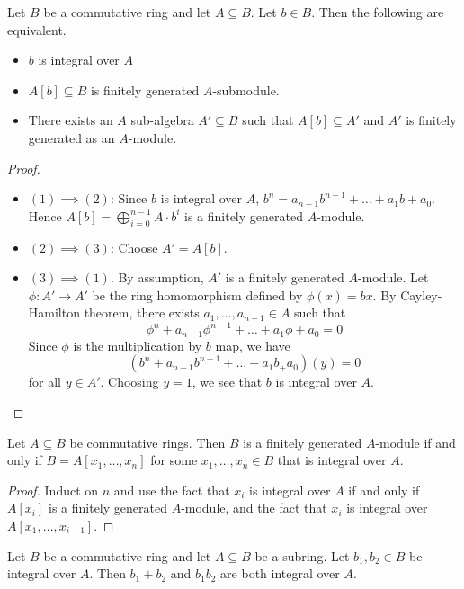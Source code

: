 \documentclass[a4paper]{article}
\begin{document}
\begin{prp}{}{} Let $B$ be a commutative ring and let $A\subseteq B$. Let $b\in B$. Then the following are equivalent. 
\begin{itemize}
\item $b$ is integral over $A$
\item $A[b]\subseteq B$ is finitely generated $A$-submodule. 
\item There exists an $A$ sub-algebra $A'\subseteq B$ such that $A[b]\subseteq A'$ and $A'$ is finitely generated as an $A$-module. 
\end{itemize} \tcbline
\begin{proof}~\\
\begin{itemize}
\item $(1)\implies(2)$: Since $b$ is integral over $A$, $b^n=a_{n-1}b^{n-1}+\dots+a_1b+a_0$. Hence $A[b]=\bigoplus_{i=0}^{n-1}A\cdot b^i$ is a finitely generated $A$-module. 
\item $(2)\implies(3)$: Choose $A'=A[b]$. 
\item $(3)\implies(1)$. By assumption, $A'$ is a finitely generated $A$-module. Let $\phi:A'\to A'$ be the ring homomorphism defined by $\phi(x)=bx$. By Cayley-Hamilton theorem, there exists $a_1,\dots,a_{n-1}\in A$ such that $$\phi^n+a_{n-1}\phi^{n-1}+\dots+a_1\phi+a_0=0$$ Since $\phi$ is the multiplication by $b$ map, we have $$(b^n+a_{n-1}b^{n-1}+\dots+a_1b_+a_0)(y)=0$$ for all $y\in A'$. Choosing $y=1$, we see that $b$ is integral over $A$. 
\end{itemize}
\end{proof}
\end{prp}

\begin{lmm}{}{} Let $A\subseteq B$ be commutative rings. Then $B$ is a finitely generated $A$-module if and only if $B=A[x_1,\dots,x_n]$ for some $x_1,\dots,x_n\in B$ that is integral over $A$. \tcbline
\begin{proof}
Induct on $n$ and use the fact that $x_i$ is integral over $A$ if and only if $A[x_i]$ is a finitely generated $A$-module, and the fact that $x_i$ is integral over $A[x_1,\dots,x_{i-1}]$. 
\end{proof}
\end{lmm}

\begin{prp}{}{} Let $B$ be a commutative ring and let $A\subseteq B$ be a subring. Let $b_1,b_2\in B$ be integral over $A$. Then $b_1+b_2$ and $b_1b_2$ are both integral over $A$. 
\end{prp}
\end{document}
